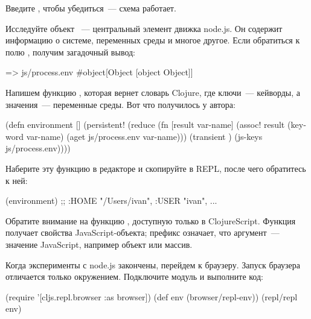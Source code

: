 Введите , чтобы убедиться~--- схема работает.

Исследуйте объект ~--- центральный элемент движка node.js. Он содержит информацию о системе, переменных среды и многое другое. Если обратиться к полю , получим загадочный вывод:

\begin{english}
  \begin{clojure}
=> js/process.env
#object[Object [object Object]]
  \end{clojure}
\end{english}

Напишем функцию , которая вернет словарь Clojure, где ключи~--- кейворды, а значения~--- переменные среды. Вот что получилось у автора:

\begin{english}
  \begin{clojure}
(defn environment []
  (persistent!
   (reduce
    (fn [result var-name]
      (assoc! result
              (keyword var-name)
              (aget js/process.env var-name)))
    (transient {})
    (js-keys js/process.env))))
  \end{clojure}
\end{english}

Наберите эту функцию в редакторе и скопируйте в REPL, после чего обратитесь к ней:

\begin{english}
  \begin{clojure}
(environment)
;; {:HOME "/Users/ivan", :USER "ivan", ...}
  \end{clojure}
\end{english}

Обратите внимание на функцию , доступную только в ClojureScript. Функция получает свойства JavaScript-объекта; префикс  означает, что аргумент~--- значение JavaScript, например объект или массив.

Когда эксперименты с node.js закончены, перейдем к браузеру. Запуск браузера отличается только окружением. Подключите модуль  и выполните код:

\begin{english}
  \begin{clojure}
(require '[cljs.repl.browser :as browser])
(def env (browser/repl-env))
(repl/repl env)
  \end{clojure}
\end{english}

